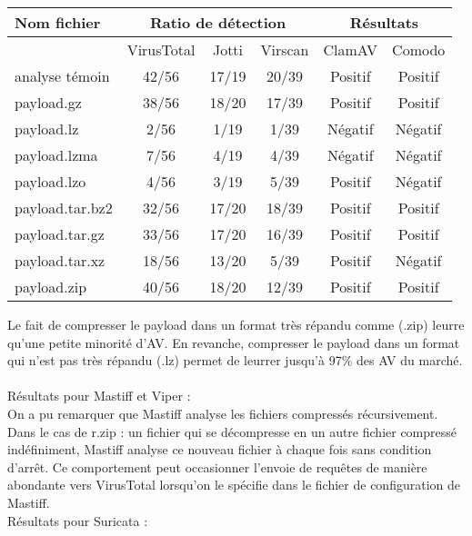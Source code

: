 \documentclass[smallextended]{svjour3}       %
\begin{document}
\begin{table}[ht!]
\begin{normalsize}
\begin{center}
\begin{tabular}{|l|c|c|c|c|c|}
    \hline
     \textbf{Nom fichier}  & \multicolumn{3}{|c|}{\textbf{Ratio de détection}} & \multicolumn{2}{|c|}{\textbf{Résultats}} \\
    \hline
     & VirusTotal & Jotti & Virscan & ClamAV & Comodo\\
     \hline
    analyse témoin & 42/56 & 17/19 & 20/39 & Positif & Positif \\
    \hline
    payload.gz & 38/56 & 18/20 & 17/39 & Positif & Positif \\
    \hline
    payload.lz & 2/56 & 1/19 & 1/39 & Négatif & Négatif\\
    \hline
    payload.lzma & 7/56 & 4/19 & 4/39 & Négatif & Négatif\\
    \hline
    payload.lzo & 4/56 & 3/19 & 5/39 & Positif & Négatif \\
    \hline
    payload.tar.bz2 & 32/56 & 17/20 & 18/39 & Positif & Positif \\
    \hline
    payload.tar.gz & 33/56 & 17/20 & 16/39 & Positif & Positif\\
    \hline
    payload.tar.xz & 18/56 & 13/20 & 5/39 & Positif & Négatif \\
    \hline
    payload.zip & 40/56 & 18/20 & 12/39 & Positif & Positif\\
    \hline
\end{tabular}
\end{center}
\end{normalsize}
\end{table}

Le fait de compresser le payload dans un format très répandu comme (.zip) leurre qu'une petite minorité d'AV. En revanche, compresser le payload dans un format qui n'est pas très répandu (.lz) permet de leurrer jusqu'à 97\% des AV du marché.
$ $\\
\\
Résultats pour Mastiff et Viper :\\
On a pu remarquer que Mastiff analyse les fichiers compressés récursivement. Dans le cas de r.zip : un fichier qui se décompresse en un autre fichier compressé indéfiniment, Mastiff analyse ce nouveau fichier à chaque fois sans condition d’arrêt. Ce comportement peut occasionner l'envoie de requêtes de manière abondante vers VirusTotal lorsqu'on le spécifie dans le fichier de configuration de Mastiff.\\
$ $\\
Résultats pour Suricata :\\
\end{document}
